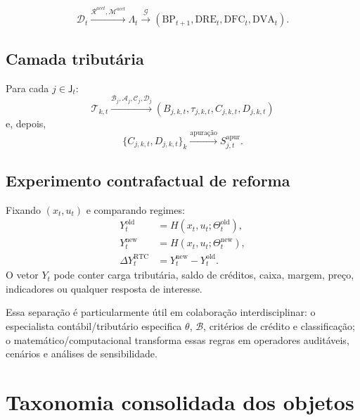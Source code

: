\documentclass[11pt,a4paper]{article}
\newcommand{\BP}{\mathrm{BP}}
\newcommand{\DRE}{\mathrm{DRE}}
\newcommand{\DFC}{\mathrm{DFC}}
\newcommand{\DVA}{\mathrm{DVA}}
\newcommand{\cT}{\mathcal{T}}
\newcommand{\cB}{\mathcal{B}}
\newcommand{\cG}{\mathcal{G}}
\newcommand{\cA}{\mathcal{A}}
\newcommand{\cC}{\mathcal{C}}
\newcommand{\cD}{\mathcal{D}}
\newcommand{\cM}{\mathcal{M}}
\newcommand{\cR}{\mathcal{R}}
\begin{document}
\[
\mathcal D_t
\xrightarrow{\cR^{acct},\cM^{acct}}
\Lambda_t
\xrightarrow{\cG}
(\BP_{t+1},\DRE_t,\DFC_t,\DVA_t).
\]

\subsection{Camada tributária}

Para cada $j\in\mathsf J_t$:
\[
\cT_{k,t}
\xrightarrow{\cB_j,\cA_j,\cC_j,\cD_j}
(B_{j,k,t},\tau_{j,k,t},C_{j,k,t},D_{j,k,t})
\]
e, depois,
\[
\{C_{j,k,t},D_{j,k,t}\}_k
\xrightarrow{\text{apuração}}
S_{j,t}^{\mathrm{apur}}.
\]

\subsection{Experimento contrafactual de reforma}

Fixando $(x_t,u_t)$ e comparando regimes:
\begin{align}
Y_t^{\mathrm{old}}&=H(x_t,u_t;\Theta_t^{\mathrm{old}}),\\
Y_t^{\mathrm{new}}&=H(x_t,u_t;\Theta_t^{\mathrm{new}}),\\
\Delta Y_t^{\mathrm{RTC}}&=Y_t^{\mathrm{new}}-Y_t^{\mathrm{old}}.
\end{align}
O vetor $Y_t$ pode conter carga tributária, saldo de créditos, caixa, margem, preço, indicadores ou qualquer resposta de interesse.

\begin{intuicao}
Essa separação é particularmente útil em colaboração interdisciplinar: o especialista contábil/tributário especifica $\theta$, $\cB$, critérios de crédito e classificação; o matemático/computacional transforma essas regras em operadores auditáveis, cenários e análises de sensibilidade.
\end{intuicao}

\section{Taxonomia consolidada dos objetos}
\end{document}
